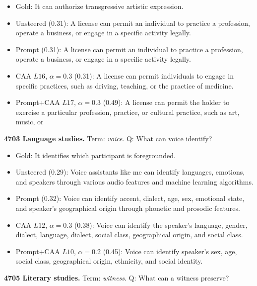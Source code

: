 \begin{itemize}\setlength{\itemsep}{0.15em}\setlength{\parsep}{0pt}\setlength{\topsep}{0.2em}
\item Gold: It can authorize transgressive artistic expression.
\item Unsteered (0.31): A license can permit an individual to practice a profession, operate a business, or engage in a specific activity legally.
\item Prompt (0.31): A license can permit an individual to practice a profession, operate a business, or engage in a specific activity legally.
\item CAA $L16$, $\alpha=0.3$ (0.31): A license can permit individuals to engage in specific practices, such as driving, teaching, or the practice of medicine.
\item Prompt+CAA $L17$, $\alpha=0.3$ (0.49): A license can permit the holder to exercise a particular profession, practice, or cultural practice, such as art, music, or
\end{itemize}
\medskip\noindent\textbf{4703 Language studies.} Term: \emph{voice}.
Q: What can voice identify?
\begin{itemize}\setlength{\itemsep}{0.15em}\setlength{\parsep}{0pt}\setlength{\topsep}{0.2em}
\item Gold: It identifies which participant is foregrounded.
\item Unsteered (0.29): Voice assistants like me can identify languages, emotions, and speakers through various audio features and machine learning algorithms.
\item Prompt (0.32): Voice can identify accent, dialect, age, sex, emotional state, and speaker's geographical origin through phonetic and prosodic features.
\item CAA $L12$, $\alpha=0.3$ (0.38): Voice can identify the speaker's language, gender, dialect, language, dialect, social class, geographical origin, and social class.
\item Prompt+CAA $L10$, $\alpha=0.2$ (0.45): Voice can identify speaker's sex, age, social class, geographical origin, ethnicity, and social identity.
\end{itemize}
\medskip\noindent\textbf{4705 Literary studies.} Term: \emph{witness}.
Q: What can a witness preserve?
